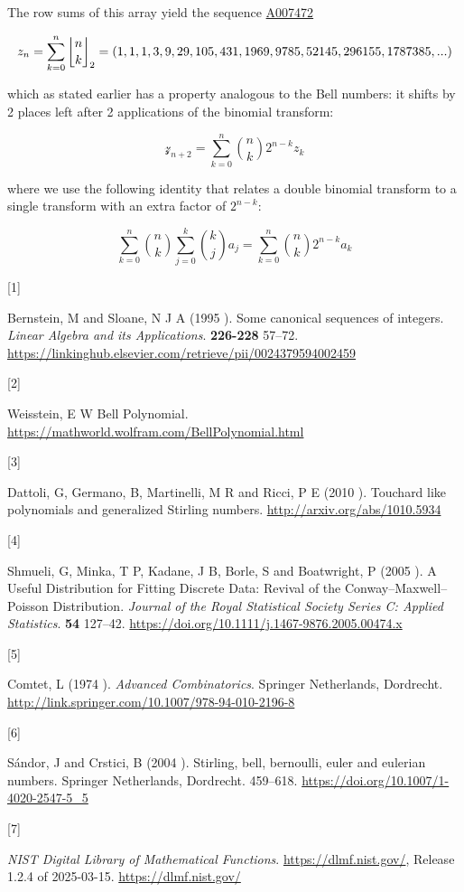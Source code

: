 \documentclass[
  letterpaper,
  DIV=11,
  numbers=noendperiod]{scrartcl}
\newlength{\cslhangindent}
\newlength{\csllabelwidth}
\newenvironment{CSLReferences}[2] %
 {\begin{list}{}{%
  \setlength{\itemindent}{0pt}
  \setlength{\leftmargin}{0pt}
  \setlength{\parsep}{0pt}
  \ifodd #1
   \setlength{\leftmargin}{\cslhangindent}
   \setlength{\itemindent}{-1\cslhangindent}
  \fi
  \setlength{\itemsep}{#2\baselineskip}}}
 {\end{list}}
\newcommand{\CSLLeftMargin}[1]{\parbox[t]{\csllabelwidth}{\strut#1\strut}}
\newcommand{\CSLRightInline}[1]{\parbox[t]{\linewidth - \csllabelwidth}{\strut#1\strut}}
\theoremstyle{plain}
\theoremstyle{remark}
\begin{document}
The row sums of this array yield the sequence
\href{https://oeis.org/A007472}{A007472}

\[
z_n = \sum_{k=0}^{n}\genfrac{\lfloor}{\rfloor}{0pt}{}{n}{k}_2 = (1, 1, 1, 3, 9, 29, 105, 431, 1969, 9785, 52145, 296155, 1787385, ...)
\]

which as stated earlier has a property analogous to the Bell numbers: it
shifts by 2 places left after 2 applications of the binomial transform:

\[
\mathscr{z}_{n+2}=\sum_{k=0}^{n}\binom{n}{k}2^{n-k}z_k
\]

where we use the following identity that relates a double binomial
transform to a single transform with an extra factor of \(2^{n-k}\):

\[
\sum_{k=0}^{n}\binom{n}{k}\sum_{j=0}^{k}\binom{k}{j}a_j = \sum_{k=0}^{n}\binom{n}{k}2^{n-k}a_k
\]

\label{refs}
\begin{CSLReferences}{0}{1}
\CSLLeftMargin{{[}1{]} }%
\CSLRightInline{Bernstein, M and Sloane, N J A (1995 ). Some canonical
sequences of integers. \emph{Linear Algebra and its Applications}.
\textbf{226-228} 57--72.
\url{https://linkinghub.elsevier.com/retrieve/pii/0024379594002459}}

\CSLLeftMargin{{[}2{]} }%
\CSLRightInline{Weisstein, E W Bell Polynomial.
\url{https://mathworld.wolfram.com/BellPolynomial.html}}

\CSLLeftMargin{{[}3{]} }%
\CSLRightInline{Dattoli, G, Germano, B, Martinelli, M R and Ricci, P E
(2010 ). Touchard like polynomials and generalized {Stirling} numbers.
\url{http://arxiv.org/abs/1010.5934}}

\CSLLeftMargin{{[}4{]} }%
\CSLRightInline{Shmueli, G, Minka, T P, Kadane, J B, Borle, S and
Boatwright, P (2005 ). A {Useful Distribution} for {Fitting Discrete
Data}: {Revival} of the {Conway}--{Maxwell}--{Poisson Distribution}.
\emph{Journal of the Royal Statistical Society Series C: Applied
Statistics}. \textbf{54} 127--42.
\url{https://doi.org/10.1111/j.1467-9876.2005.00474.x}}

\CSLLeftMargin{{[}5{]} }%
\CSLRightInline{Comtet, L (1974 ). \emph{Advanced Combinatorics}.
Springer Netherlands, Dordrecht.
\url{http://link.springer.com/10.1007/978-94-010-2196-8}}

\CSLLeftMargin{{[}6{]} }%
\CSLRightInline{Sándor, J and Crstici, B (2004 ). Stirling, bell,
bernoulli, euler and eulerian numbers. Springer Netherlands, Dordrecht.
459--618. \url{https://doi.org/10.1007/1-4020-2547-5_5}}

\CSLLeftMargin{{[}7{]} }%
\CSLRightInline{{\emph{NIST Digital Library of Mathematical Functions}}.
\url{https://dlmf.nist.gov/}, Release 1.2.4 of 2025-03-15.
\url{https://dlmf.nist.gov/}}

\end{CSLReferences}
\end{document}
